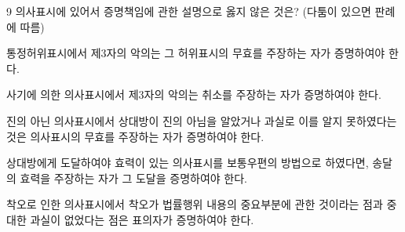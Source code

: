 \begin{question}{9}
의사표시에 있어서 증명책임에 관한 설명으로 옳지 않은 것은? (다툼이 있으면 판례에 따름)
\begin{choices}
  \item 통정허위표시에서 제3자의 악의는 그 허위표시의 무효를 주장하는 자가 증명하여야 한다.
  \item 사기에 의한 의사표시에서 제3자의 악의는 취소를 주장하는 자가 증명하여야 한다.
  \item 진의 아닌 의사표시에서 상대방이 진의 아님을 알았거나 과실로 이를 알지 못하였다는 것은 의사표시의 무효를 주장하는 자가 증명하여야 한다.
  \item 상대방에게 도달하여야 효력이 있는 의사표시를 보통우편의 방법으로 하였다면, 송달의 효력을 주장하는 자가 그 도달을 증명하여야 한다.
  \item 착오로 인한 의사표시에서 착오가 법률행위 내용의 중요부분에 관한 것이라는 점과 중대한 과실이 없었다는 점은 표의자가 증명하여야 한다.
\end{choices}
\end{question}
